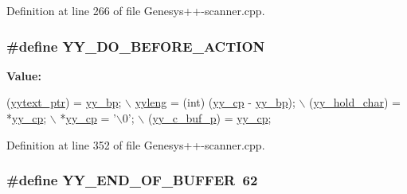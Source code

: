 Definition at line 266 of file Genesys++-\/scanner.\-cpp.

\hypertarget{_genesys_09_09-scanner_8cpp_acc3486d769af4e4b2820346a0093cc79}{
\subsubsection[{Y\-Y\-\_\-\-D\-O\-\_\-\-B\-E\-F\-O\-R\-E\-\_\-\-A\-C\-T\-I\-O\-N}]{\setlength{\rightskip}{0pt plus 5cm}\#define Y\-Y\-\_\-\-D\-O\-\_\-\-B\-E\-F\-O\-R\-E\-\_\-\-A\-C\-T\-I\-O\-N}}\label{_genesys_09_09-scanner_8cpp_acc3486d769af4e4b2820346a0093cc79}
{\bfseries Value\-:}
\begin{DoxyCode}
(\hyperlink{_genesys_09_09-scanner_8cpp_a790a191a93ef4d3b8c0bb43fd7480052}{yytext\_ptr}) = \hyperlink{_genesys_09_09-scanner_8cpp_aa749693ef7d0c10b137e887638fdc5b2}{yy\_bp}; \hyperlink{_genesys_09_09-scanner_8cpp_a1b5865350b5ca5c1d69f429c2a652953}{\(\backslash\)}
\hyperlink{_genesys_09_09-scanner_8cpp_a1b5865350b5ca5c1d69f429c2a652953}{    yyleng} = (int) (\hyperlink{_genesys_09_09-scanner_8cpp_a61b01b6b236b05090b972f8fd95da539}{yy\_cp} - \hyperlink{_genesys_09_09-scanner_8cpp_aa749693ef7d0c10b137e887638fdc5b2}{yy\_bp}); \(\backslash\)
    (\hyperlink{_genesys_09_09-scanner_8cpp_a13f78e763996d2d86c85b45cbe146282}{yy\_hold\_char}) = *\hyperlink{_genesys_09_09-scanner_8cpp_a61b01b6b236b05090b972f8fd95da539}{yy\_cp}; \(\backslash\)
    *\hyperlink{_genesys_09_09-scanner_8cpp_a61b01b6b236b05090b972f8fd95da539}{yy\_cp} = \textcolor{charliteral}{'\(\backslash\)0'}; \(\backslash\)
    (\hyperlink{_genesys_09_09-scanner_8cpp_ade8fc57d3529bff56440a4f3e9c29586}{yy\_c\_buf\_p}) = \hyperlink{_genesys_09_09-scanner_8cpp_a61b01b6b236b05090b972f8fd95da539}{yy\_cp};
\end{DoxyCode}


Definition at line 352 of file Genesys++-\/scanner.\-cpp.

\hypertarget{_genesys_09_09-scanner_8cpp_ab2708fd42cff29ce6a0a52b91bea40d1}{
\subsubsection[{Y\-Y\-\_\-\-E\-N\-D\-\_\-\-O\-F\-\_\-\-B\-U\-F\-F\-E\-R}]{\setlength{\rightskip}{0pt plus 5cm}\#define Y\-Y\-\_\-\-E\-N\-D\-\_\-\-O\-F\-\_\-\-B\-U\-F\-F\-E\-R~62}}\label{_genesys_09_09-scanner_8cpp_ab2708fd42cff29ce6a0a52b91bea40d1}


